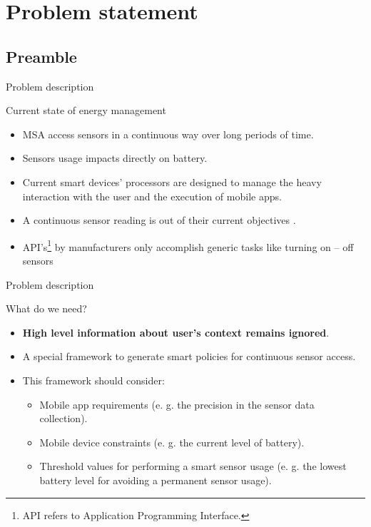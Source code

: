 \section{Problem statement}

\subsection{Preamble}

\begin{frame}{Problem description}
  \begin{block}{Current state of energy management}
    \begin{itemize}
      \item MSA access sensors in a continuous way over long periods of time.
      \item Sensors usage impacts directly on battery.
      \item Current smart devices' processors are designed to manage the heavy interaction with the user and the execution of mobile apps.
      \item A continuous sensor reading is out of their current objectives \citep{Priyantha2011}.
      \item API’s\footnote{API refers to Application Programming Interface.} by manufacturers only accomplish generic tasks like turning on – off sensors
    \end{itemize}
  \end{block}
\end{frame}

\begin{frame}{Problem description}
  \begin{block}{What do we need?}
    \begin{itemize}
      \item \textbf{High level information about user's context remains ignored}.
      \item A special framework to generate smart policies for continuous sensor access.
      \item This framework should consider:
        \begin{itemize}
          \item Mobile app requirements (e. g. the precision in the sensor data collection).
          \item Mobile device constraints (e. g. the current level of battery).
          \item Threshold values for performing a smart sensor usage (e. g. the lowest battery level for avoiding a permanent sensor usage).
        \end{itemize}
    \end{itemize}
  \end{block}
\end{frame}

